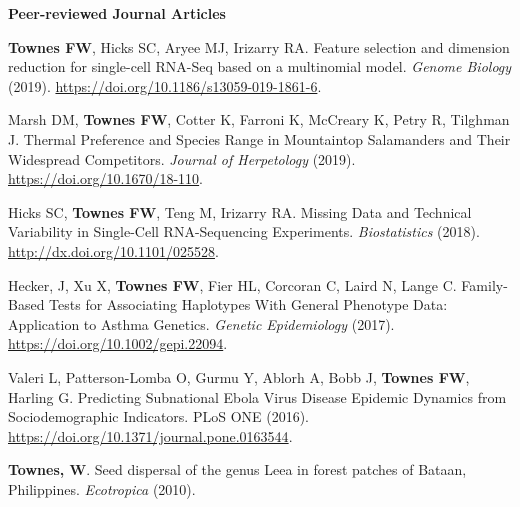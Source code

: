 \documentclass[10pt]{article}
\begin{document}

\textbf{Peer-reviewed Journal Articles}
\begin{enumerate}[label= {[\arabic*]}]
\item {\bf Townes FW}, Hicks SC, Aryee MJ, Irizarry RA. Feature selection and dimension reduction for single-cell RNA-Seq based on a multinomial model. {\it Genome Biology} (2019). \url{https://doi.org/10.1186/s13059-019-1861-6}.
\item Marsh DM, {\bf Townes FW}, Cotter K, Farroni K, McCreary K, Petry R, Tilghman J. Thermal Preference and Species Range in Mountaintop Salamanders and Their Widespread Competitors. {\it Journal of Herpetology} (2019). \url{https://doi.org/10.1670/18-110}.
\item Hicks SC, {\bf Townes FW}, Teng M, Irizarry RA. Missing Data and Technical Variability in Single-Cell RNA-Sequencing Experiments. {\it Biostatistics} (2018). \url{http://dx.doi.org/10.1101/025528}.
\item Hecker, J, Xu X, {\bf Townes FW}, Fier HL, Corcoran C, Laird N, Lange C. Family-Based Tests for Associating Haplotypes With General Phenotype Data: Application to Asthma Genetics. {\it Genetic Epidemiology} (2017). \url{https://doi.org/10.1002/gepi.22094}.
\item Valeri L, Patterson-Lomba O, Gurmu Y, Ablorh A, Bobb J, {\bf Townes FW}, Harling G. Predicting Subnational Ebola Virus Disease Epidemic Dynamics from Sociodemographic Indicators. PLoS ONE (2016). \url{https://doi.org/10.1371/journal.pone.0163544}.
\item {\bf Townes, W}. Seed dispersal of the genus Leea in forest patches of Bataan, Philippines. {\it Ecotropica } (2010).
\end{enumerate}

\end{document}
